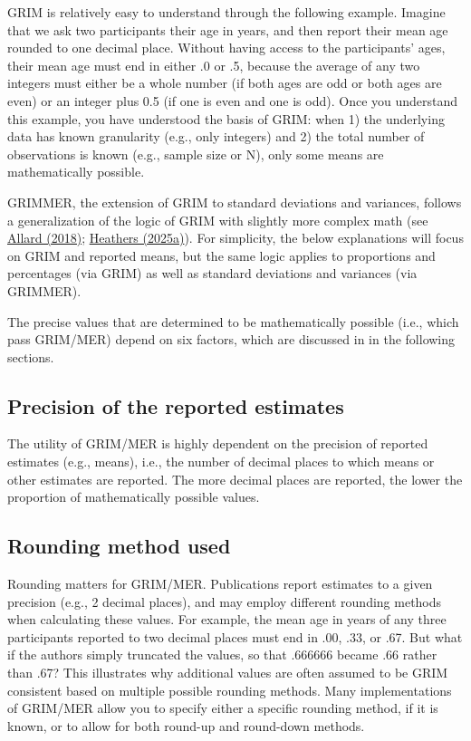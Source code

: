 \documentclass[letterpaper, 12pt]{article}
\begin{document}
{GRIM is relatively easy to understand through the following example. Imagine that we ask two participants their age in years, and then report their mean age rounded to one decimal place. Without having access to the participants' ages, their mean age must end in either .0 or .5, because the average of any two integers must either be a whole number (if both ages are odd or both ages are even) or an integer plus 0.5 (if one is even and one is odd). Once you understand this example, you have understood the basis of GRIM: when 1) the underlying data has known granularity (e.g., only integers) and 2) the total number of observations is known (e.g., sample size or N), only some means are mathematically possible. 

GRIMMER, the extension of GRIM to standard deviations and variances, follows a generalization of the logic of GRIM with slightly more complex math (see \href{https://aurelienallard.netlify.app/post/anaytic-grimmer-possibility-standard-deviations/}{Allard (2018)}; \href{https://jamesheathers.curve.space}{Heathers (2025a)}). For simplicity, the below explanations will focus on GRIM and reported means, but the same logic applies to proportions and percentages (via GRIM) as well as standard deviations and variances (via GRIMMER).

The precise values that are determined to be mathematically possible (i.e., which pass GRIM/MER) depend on six factors, which are discussed in in the following sections.

\subsection*{Precision of the reported estimates}

The utility of GRIM/MER is highly dependent on the precision of reported estimates (e.g., means), i.e., the number of decimal places to which means or other estimates are reported. The more decimal places are reported, the lower the proportion of mathematically possible values.

\subsection*{Rounding method used}

Rounding matters for GRIM/MER. Publications report estimates to a given precision (e.g., 2 decimal places), and may employ different rounding methods when calculating these values. For example, the mean age in years of any three participants reported to two decimal places must end in .00, .33, or .67. But what if the authors simply truncated the values, so that .666666 became .66 rather than .67? This illustrates why additional values are often assumed to be GRIM consistent based on multiple possible rounding methods. Many implementations of GRIM/MER allow you to specify either a specific rounding method, if it is known, or to allow for both round-up and round-down methods. 

}
\end{document}
